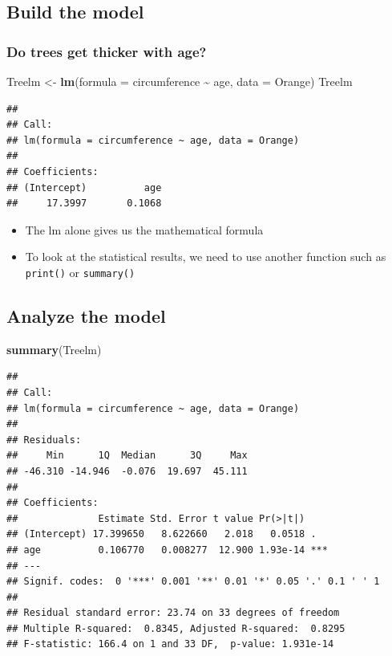 \documentclass[
]{book}
\newenvironment{Shaded}{\begin{snugshade}}{\end{snugshade}}
\newcommand{\AttributeTok}[1]{\textcolor[rgb]{0.13,0.29,0.53}{#1}}
\newcommand{\FunctionTok}[1]{\textcolor[rgb]{0.13,0.29,0.53}{\textbf{#1}}}
\newcommand{\NormalTok}[1]{#1}
\newcommand{\OtherTok}[1]{\textcolor[rgb]{0.56,0.35,0.01}{#1}}
\newcommand{\SpecialCharTok}[1]{\textcolor[rgb]{0.81,0.36,0.00}{\textbf{#1}}}
\providecommand{\tightlist}{%
  \setlength{\itemsep}{0pt}\setlength{\parskip}{0pt}}
\begin{document}
\subsection{Build the model}\label{build-the-model-1}

\subsubsection{Do trees get thicker with age?}\label{do-trees-get-thicker-with-age}

\begin{Shaded}
\begin{Highlighting}[]
\NormalTok{Treelm }\OtherTok{\textless{}{-}} \FunctionTok{lm}\NormalTok{(}\AttributeTok{formula =}\NormalTok{ circumference }\SpecialCharTok{\textasciitilde{}}\NormalTok{ age, }\AttributeTok{data =}\NormalTok{ Orange)}
\NormalTok{Treelm}
\end{Highlighting}
\end{Shaded}

\begin{verbatim}
## 
## Call:
## lm(formula = circumference ~ age, data = Orange)
## 
## Coefficients:
## (Intercept)          age  
##     17.3997       0.1068
\end{verbatim}

\begin{itemize}
\tightlist
\item
  The lm alone gives us the mathematical formula
\item
  To look at the statistical results, we need to use another function such as \texttt{print()} or \texttt{summary()}
\end{itemize}

\subsection{Analyze the model}\label{analyze-the-model}

\begin{Shaded}
\begin{Highlighting}[]
\FunctionTok{summary}\NormalTok{(Treelm)}
\end{Highlighting}
\end{Shaded}

\begin{verbatim}
## 
## Call:
## lm(formula = circumference ~ age, data = Orange)
## 
## Residuals:
##     Min      1Q  Median      3Q     Max 
## -46.310 -14.946  -0.076  19.697  45.111 
## 
## Coefficients:
##              Estimate Std. Error t value Pr(>|t|)    
## (Intercept) 17.399650   8.622660   2.018   0.0518 .  
## age          0.106770   0.008277  12.900 1.93e-14 ***
## ---
## Signif. codes:  0 '***' 0.001 '**' 0.01 '*' 0.05 '.' 0.1 ' ' 1
## 
## Residual standard error: 23.74 on 33 degrees of freedom
## Multiple R-squared:  0.8345, Adjusted R-squared:  0.8295 
## F-statistic: 166.4 on 1 and 33 DF,  p-value: 1.931e-14
\end{verbatim}
\end{document}
